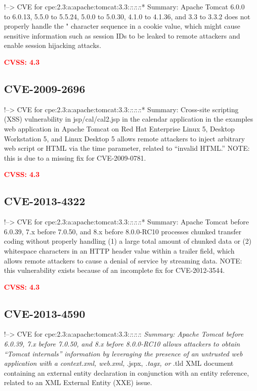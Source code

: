 \documentclass[a4paper, 12pt]{article}
\begin{document}
!--\textgreater{} CVE for
cpe:2.3:a:apache:tomcat:3.3:\emph{:}:\emph{:}:\emph{:}:* Summary: Apache
Tomcat 6.0.0 to 6.0.13, 5.5.0 to 5.5.24, 5.0.0 to 5.0.30, 4.1.0 to
4.1.36, and 3.3 to 3.3.2 does not properly handle the " character
sequence in a cookie value, which might cause sensitive information such
as session IDs to be leaked to remote attackers and enable session
hijacking attacks.

\textbf{\textcolor{red}{CVSS: 4.3}}

\hypertarget{cve-2009-2696}{%
\subsection{CVE-2009-2696}\label{cve-2009-2696}}

!--\textgreater{} CVE for
cpe:2.3:a:apache:tomcat:3.3:\emph{:}:\emph{:}:\emph{:}:* Summary:
Cross-site scripting (XSS) vulnerability in jsp/cal/cal2.jsp in the
calendar application in the examples web application in Apache Tomcat on
Red Hat Enterprise Linux 5, Desktop Workstation 5, and Linux Desktop 5
allows remote attackers to inject arbitrary web script or HTML via the
time parameter, related to ``invalid HTML.'' NOTE: this is due to a
missing fix for CVE-2009-0781.

\textbf{\textcolor{red}{CVSS: 4.3}}

\hypertarget{cve-2013-4322}{%
\subsection{CVE-2013-4322}\label{cve-2013-4322}}

!--\textgreater{} CVE for
cpe:2.3:a:apache:tomcat:3.3:\emph{:}:\emph{:}:\emph{:}:* Summary: Apache
Tomcat before 6.0.39, 7.x before 7.0.50, and 8.x before 8.0.0-RC10
processes chunked transfer coding without properly handling (1) a large
total amount of chunked data or (2) whitespace characters in an HTTP
header value within a trailer field, which allows remote attackers to
cause a denial of service by streaming data. NOTE: this vulnerability
exists because of an incomplete fix for CVE-2012-3544.

\textbf{\textcolor{red}{CVSS: 4.3}}

\hypertarget{cve-2013-4590}{%
\subsection{CVE-2013-4590}\label{cve-2013-4590}}

!--\textgreater{} CVE for
cpe:2.3:a:apache:tomcat:3.3:\emph{:}:\emph{:}:\emph{:}:\emph{ Summary:
Apache Tomcat before 6.0.39, 7.x before 7.0.50, and 8.x before
8.0.0-RC10 allows attackers to obtain ``Tomcat internals'' information
by leveraging the presence of an untrusted web application with a
context.xml, web.xml, }.jspx, \emph{.tagx, or }.tld XML document
containing an external entity declaration in conjunction with an entity
reference, related to an XML External Entity (XXE) issue.
\end{document}

